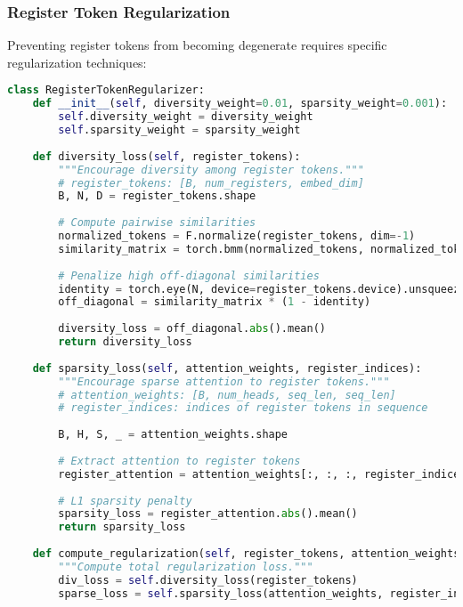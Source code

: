 \subsubsection{Register Token Regularization}

Preventing register tokens from becoming degenerate requires specific regularization techniques:

\begin{lstlisting}[language=Python, caption=Register token regularization strategies]
class RegisterTokenRegularizer:
    def __init__(self, diversity_weight=0.01, sparsity_weight=0.001):
        self.diversity_weight = diversity_weight
        self.sparsity_weight = sparsity_weight
    
    def diversity_loss(self, register_tokens):
        """Encourage diversity among register tokens."""
        # register_tokens: [B, num_registers, embed_dim]
        B, N, D = register_tokens.shape
        
        # Compute pairwise similarities
        normalized_tokens = F.normalize(register_tokens, dim=-1)
        similarity_matrix = torch.bmm(normalized_tokens, normalized_tokens.transpose(-2, -1))
        
        # Penalize high off-diagonal similarities
        identity = torch.eye(N, device=register_tokens.device).unsqueeze(0).expand(B, -1, -1)
        off_diagonal = similarity_matrix * (1 - identity)
        
        diversity_loss = off_diagonal.abs().mean()
        return diversity_loss
    
    def sparsity_loss(self, attention_weights, register_indices):
        """Encourage sparse attention to register tokens."""
        # attention_weights: [B, num_heads, seq_len, seq_len]
        # register_indices: indices of register tokens in sequence
        
        B, H, S, _ = attention_weights.shape
        
        # Extract attention to register tokens
        register_attention = attention_weights[:, :, :, register_indices]
        
        # L1 sparsity penalty
        sparsity_loss = register_attention.abs().mean()
        return sparsity_loss
    
    def compute_regularization(self, register_tokens, attention_weights, register_indices):
        """Compute total regularization loss."""
        div_loss = self.diversity_loss(register_tokens)
        sparse_loss = self.sparsity_loss(attention_weights, register_indices)
        

\end{lstlisting}
